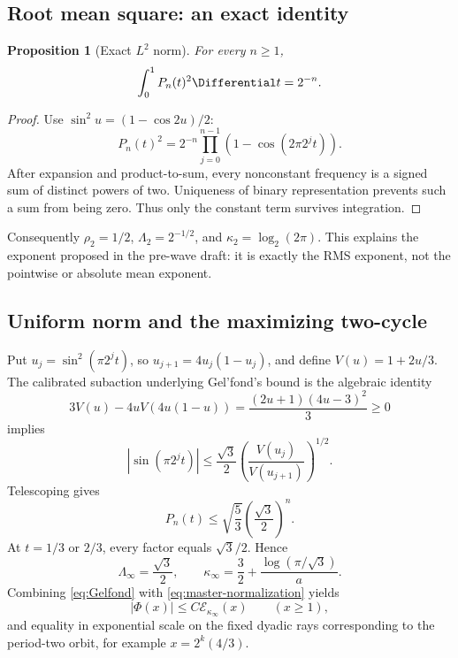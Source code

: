 \documentclass[11pt]{article}
\newtheorem{proposition}[theorem]{Proposition}
\theoremstyle{definition}
\theoremstyle{remark}
\newcommand{\Ecal}{\mathcal E}
\begin{document}
\subsection{Root mean square: an exact identity}

\begin{proposition}[Exact \(L^2\) norm]
\label{prop:L2}
For every \(n\ge1\),
\begin{equation}
 \int_0^1P_n(t)^2\Differential t=2^{-n}.
 \label{eq:L2}
\end{equation}
\end{proposition}

\begin{proof}
Use \(\sin^2u=(1-\cos2u)/2\):
\[
 P_n(t)^2=2^{-n}\prod_{j=0}^{n-1}
 (1-\cos(2\pi2^jt)).
\]
After expansion and product-to-sum, every nonconstant frequency is a signed
sum of distinct powers of two.  Uniqueness of binary representation prevents
such a sum from being zero.  Thus only the constant term survives integration.
\end{proof}
Consequently \(\rho_2=1/2\), \(\Lambda_2=2^{-1/2}\), and
\(\kappa_2=\log_2(2\pi)\).  This explains the exponent proposed in the
pre-wave draft: it is exactly the RMS exponent, not the pointwise or absolute
mean exponent.

\subsection{Uniform norm and the maximizing two-cycle}

Put \(u_j=\sin^2(\pi2^jt)\), so
\(u_{j+1}=4u_j(1-u_j)\), and define
\(V(u)=1+2u/3\).  The calibrated subaction underlying Gel'fond's bound\cite{gelfond} is the algebraic identity
\begin{equation}
 3V(u)-4uV(4u(1-u))
 =\frac{(2u+1)(4u-3)^2}{3}\ge0
 \label{eq:subaction-identity}
\end{equation}
implies
\begin{equation}
 |\sin(\pi2^jt)|
 \le\frac{\sqrt3}{2}
 \left(\frac{V(u_j)}{V(u_{j+1})}\right)^{1/2}.
 \label{eq:one-step-Gelfond}
\end{equation}
Telescoping gives
\begin{equation}
 P_n(t)\le\sqrt{\frac53}\left(\frac{\sqrt3}{2}\right)^n.
 \label{eq:Gelfond}
\end{equation}
At \(t=1/3\) or \(2/3\), every factor equals \(\sqrt3/2\).  Hence
\begin{equation}
 \Lambda_\infty=\frac{\sqrt3}{2},
 \qquad
 \kappa_\infty=\frac32+\frac{\log(\pi/\sqrt3)}{a}.
 \label{eq:Linfty}
\end{equation}
Combining \eqref{eq:Gelfond} with \eqref{eq:master-normalization} yields
\begin{equation}
 |\Phi(x)|\le C\Ecal_{\kappa_\infty}(x)
 \qquad(x\ge1),
 \label{eq:pointwise-upper}
\end{equation}
and equality in exponential scale on the fixed dyadic rays corresponding to
the period-two orbit, for example \(x=2^k(4/3)\).
\end{document}
